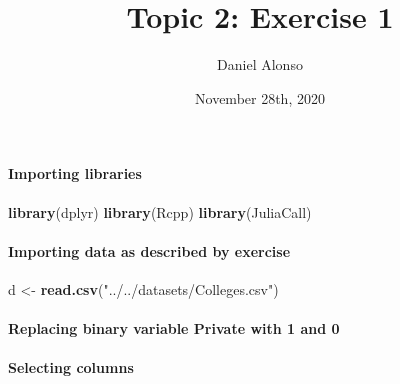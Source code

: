 \documentclass[]{article}
\title{Topic 2: Exercise 1}
\author{Daniel Alonso}
\date{November 28th, 2020}
\newenvironment{Shaded}{\begin{snugshade}}{\end{snugshade}}
\newcommand{\DecValTok}[1]{\textcolor[rgb]{0.00,0.00,0.81}{#1}}
\newcommand{\KeywordTok}[1]{\textcolor[rgb]{0.13,0.29,0.53}{\textbf{#1}}}
\newcommand{\NormalTok}[1]{#1}
\newcommand{\OperatorTok}[1]{\textcolor[rgb]{0.81,0.36,0.00}{\textbf{#1}}}
\newcommand{\StringTok}[1]{\textcolor[rgb]{0.31,0.60,0.02}{#1}}
\let\oldparagraph\paragraph
\renewcommand{\paragraph}[1]{\oldparagraph{#1}\mbox{}}
\begin{document}
\maketitle

\hypertarget{importing-libraries}{%
\paragraph{Importing libraries}\label{importing-libraries}}

\begin{Shaded}
\begin{Highlighting}[]
\KeywordTok{library}\NormalTok{(dplyr)}
\KeywordTok{library}\NormalTok{(Rcpp)}
\KeywordTok{library}\NormalTok{(JuliaCall)}
\end{Highlighting}
\end{Shaded}

\hypertarget{importing-data-as-described-by-exercise}{%
\paragraph{Importing data as described by
exercise}\label{importing-data-as-described-by-exercise}}

\begin{Shaded}
\begin{Highlighting}[]
\NormalTok{d <-}\StringTok{ }\KeywordTok{read.csv}\NormalTok{(}\StringTok{"../../datasets/Colleges.csv"}\NormalTok{)}
\end{Highlighting}
\end{Shaded}

\hypertarget{replacing-binary-variable-private-with-1-and-0}{%
\paragraph{Replacing binary variable Private with 1 and
0}\label{replacing-binary-variable-private-with-1-and-0}}

\begin{Shaded}
\end{Shaded}

\hypertarget{selecting-columns}{%
\paragraph{Selecting columns}\label{selecting-columns}}
\end{document}
